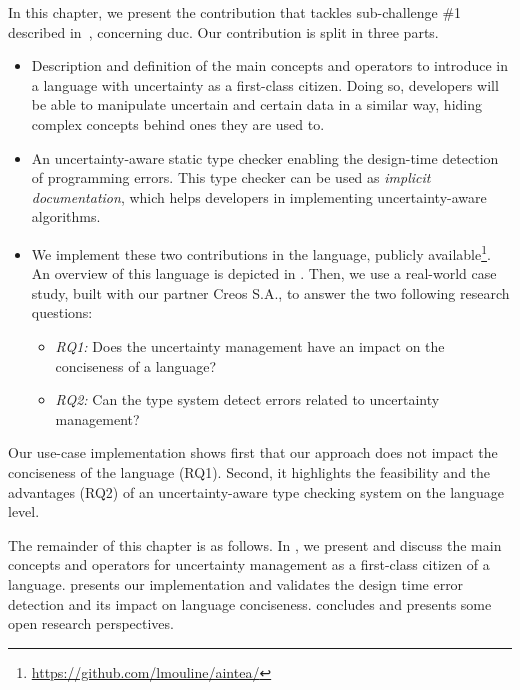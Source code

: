 In this chapter, we present the contribution that tackles sub-challenge \#1 described in~, concerning \gls{duc}.
Our contribution is split in three parts.
\begin{itemize}
	\vspace{-0.5em}
	\setlength\itemsep{-0.3em}
    \item Description and definition of the main concepts and operators to introduce in a language with uncertainty as a first-class citizen. Doing so, developers will be able to manipulate uncertain and certain data in a similar way, hiding complex concepts behind ones they are used to. 
    \item An uncertainty-aware static type checker enabling the design-time detection of programming errors. This type checker can be used as \textit{implicit documentation}, which helps developers in implementing uncertainty-aware algorithms.
    \item We implement these two contributions in the \langName{} language, publicly available\footnote{\url{https://github.com/lmouline/aintea/}}. An overview of this language is depicted in . Then, we use a real-world case study, built with our partner Creos S.A., to answer the two following research questions: 
    \begin{itemize}
   		\vspace{-0.5em}
		\setlength\itemsep{-0.3em}
    	\item \textit{RQ1:} Does the uncertainty management have an impact on the conciseness of a language? 
		\item \textit{RQ2:} Can the type system detect errors related to uncertainty management?
    \end{itemize}
\end{itemize}

Our use-case implementation shows first that our approach does not impact the conciseness of the language (RQ1).
Second, it highlights the feasibility and the advantages (RQ2) of an uncertainty-aware type checking system on the language level.

The remainder of this chapter is as follows.
In , we present and discuss the main concepts and operators for uncertainty management as a first-class citizen of a language. 
 presents our \langName{} implementation and validates the design time error detection and its impact on language conciseness. 
 concludes and presents some open research perspectives. 

\vfill